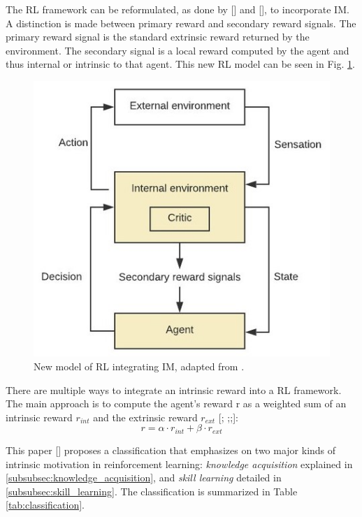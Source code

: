 \documentclass[conference]{IEEEtran}
\begin{document}
The RL framework can be reformulated, as done by [\cite{singh2010intrinsically}] and [\cite{barto2004intrinsically}], to incorporate IM. A distinction is made between primary reward and secondary reward signals. The primary reward signal is the standard extrinsic reward returned by the environment. The secondary signal is a local reward computed by the agent and thus internal or intrinsic to that agent. This new RL model can be seen in  Fig. \ref{fig:new_rl_model}.
\begin{figure}[h]
\centering
\includegraphics[width=0.9\columnwidth]{img/New-model-of-RL-integrating-IM-adapted-from-Singh-et-al-2010_W640.jpg}
\caption{New model of RL integrating IM, adapted from \cite{singh2010intrinsically}.}
\label{fig:new_rl_model}
\end{figure}

There are multiple ways to integrate an intrinsic reward into a RL framework. The main approach is to compute the agent’s reward r as a weighted sum
of an intrinsic reward $r_{int}$ and the extrinsic reward $r_{ext}$ [\cite{burda2018exploration}; \cite{gregor2016variational};\cite{vezhnevets2017feudal};\cite{huang2019learning}]:
\begin{equation*}
r = \alpha \cdot r_{int} + \beta \cdot r_{ext}
\end{equation*}

This paper [\cite{aubret2019survey}] proposes a classification that emphasizes on two major kinds of intrinsic motivation in reinforcement learning: \textit{knowledge acquisition} explained in \ref{subsubsec:knowledge_acquisition}, and \textit{skill learning} detailed in \ref{subsubsec:skill_learning}. The classification is summarized in Table \ref{tab:classification}.
\end{document}
